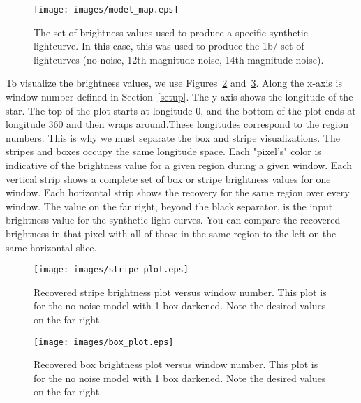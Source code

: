 \begin{figure}[h]
	\centering
	\texttt{[image: images/model\_map.eps]}
	\caption{The set of brightness values used to produce a specific synthetic lightcurve. In this case, this was used to produce the 1b/ set of lightcurves (no noise, 12th magnitude noise, 14th magnitude noise).}
	\label{model_map}
\end{figure}

To visualize the brightness values, we use Figures~\ref{stripe_plot} and~\ref{box_plot}. Along the x-axis is window number defined in Section~\ref{setup}. The y-axis shows the longitude of the star. The top of the plot starts at longitude 0, and the bottom of the plot ends at longitude 360 and then wraps around.These longitudes correspond to the region numbers. This is why we must separate the box and stripe visualizations. The stripes and boxes occupy the same longitude space. Each "pixel's" color is indicative of the brightness value for a given region during a given window. Each vertical strip shows a complete set of box or stripe brightness values for one window. Each horizontal strip shows the recovery for the same region over every window. The value on the far right, beyond the black separator, is the input brightness value for the synthetic light curves. You can compare the recovered brightness in that pixel with all of those in the same region to the left on the same horizontal slice.

\begin{figure}[h]
	\centering
	\texttt{[image: images/stripe\_plot.eps]}
	\caption{Recovered stripe brightness plot versus window number. This plot is for the no noise model with 1 box darkened. Note the desired values on the far right.}
	\label{stripe_plot}
\end{figure}

\begin{figure}[h]
	\centering
	\texttt{[image: images/box\_plot.eps]}
	\caption{Recovered box brightness plot versus window number.  This plot is for the no noise model with 1 box darkened. Note the desired values on the far right.}
	\label{box_plot}
\end{figure}

